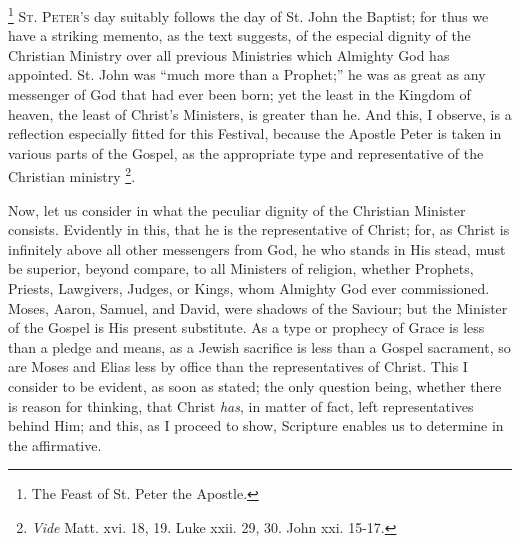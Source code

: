 \footnote{The Feast of St. Peter the Apostle.} S\textsc{t}.
P\textsc{eter's} day suitably
follows the day of St. John the Baptist; for thus we have a striking
memento, as the text suggests, of the especial dignity of the Christian
Ministry over all previous Ministries which Almighty God has appointed.
St. John was ``much more than a Prophet;'' he was as great as
any messenger of God that had ever been born; yet the least in the
Kingdom of heaven, the least of Christ's Ministers, is greater than he.
And this, I observe, is a reflection especially fitted for this
Festival, because the Apostle Peter is taken in various parts of the
Gospel, as the appropriate type and representative of the Christian
ministry \footnote{\emph{Vide} Matt. xvi. 18, 19.
Luke xxii. 29, 30. John xxi. 15-17.}.

Now, let us consider in what the peculiar dignity of the Christian
Minister consists. Evidently in this, that he is the representative of
Christ; for, as Christ is infinitely above all other messengers from
God, he who stands in His stead, must be superior, beyond compare, to
all Ministers of religion, whether Prophets, Priests, Lawgivers, Judges,
or Kings, whom Almighty God ever commissioned. Moses, Aaron, Samuel, and
David, were shadows of the Saviour; but the Minister of the Gospel is
His present substitute. As a type or prophecy of Grace is less than a
pledge and means, as a Jewish sacrifice is less than a Gospel sacrament,
so are Moses and Elias less by office than the representatives of
Christ. This I consider to be evident, as soon as stated; the only
question being, whether there is reason for thinking, that Christ \emph{has},
in matter of fact, left representatives behind Him; and this, as I
proceed to show, Scripture enables us to determine in the affirmative.

